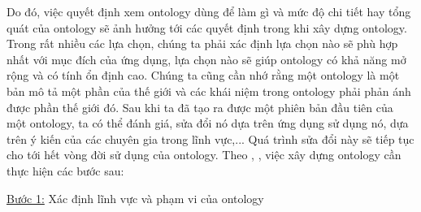 Do đó, việc quyết định xem ontology dùng để làm gì và mức độ chi tiết hay tổng quát của ontology sẽ ảnh hưởng tới các quyết định trong khi xây dựng ontology. Trong rất nhiều các lựa chọn, chúng ta phải xác định lựa chọn nào sẽ phù hợp nhất với mục đích của ứng dụng, lựa chọn nào sẽ giúp ontology có khả năng mở rộng và có tính ổn định cao. Chúng ta cũng cần nhớ rằng một ontology là một bản mô tả một phần của thế giới và các khái niệm trong ontology phải phản ánh được phần thế giới đó. Sau khi ta đã tạo ra được một phiên bản đầu tiên của một ontology, ta có thể đánh giá, sửa đổi nó dựa trên ứng dụng sử dụng nó,  dựa trên ý kiến của các chuyên gia trong lĩnh vực,... Quá trình sửa đổi này sẽ tiếp tục cho tới hết vòng đời sử dụng của ontology.
Theo \cite{howtocreateontology1}, \cite{howtocreateontology2}, việc xây dựng ontology cần thực hiện các bước sau:

\underline{Bước 1:} Xác định lĩnh vực và phạm vi của ontology

